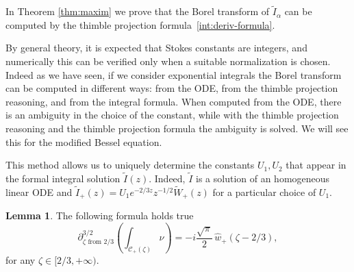 \documentclass{article}
\theoremstyle{definition}
\newtheorem{lemma}[definition]{Lemma}
\begin{document}
In Theorem \eqref{thm:maxim} we prove that the Borel transform of $\tilde{I}_{\alpha}$ can be computed by the thimble projection formula~\eqref{int:deriv-formula}. \color{olive} 

By general theory, it is expected that Stokes constants are integers, and numerically this can be verified only when a suitable normalization is chosen. Indeed as we have seen, if we consider exponential integrals the Borel transform can be computed in different ways: from the ODE, from the thimble projection reasoning, and from the integral formula. When computed from the ODE, there is an ambiguity in the choice of the constant, while with the thimble projection reasoning and the thimble projection formula the ambiguity is solved. We will see this for the modified Bessel equation. 

This method allows us to uniquely determine the constants $U_1,U_2$ that appear in the formal integral solution $\tilde{I}(z)$. Indeed, $\tilde{I}$ is a solution of an homogeneous linear ODE and $\tilde{I}_+(z)=U_1e^{-2/3z}z^{-1/2}\tilde{W}_+(z)$ for a particular choice of $U_1$. %
\begin{lemma}\label{claim 2}
The following formula holds true
\[ \partial^{3/2}_{\zeta \text{ from } 2/3} \left( \int_{\mathcal{C}_+(\zeta)} \nu \right) = -i \frac{\sqrt{\pi}}{2}\,\hat{w}_+(\zeta-2/3), \]
for any $\zeta\in [2/3,+\infty)$.
\end{lemma}
\end{document}
